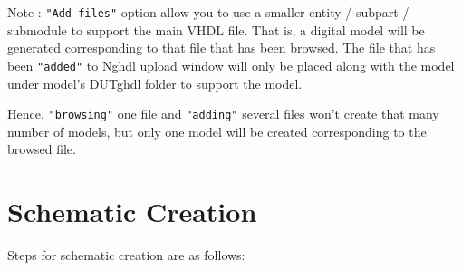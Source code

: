 \begin{enumerate}
Note : \texttt{"Add files"} option allow you to use a smaller entity / subpart / submodule to support the main VHDL file. That is, a digital model will be generated corresponding to that file that has been browsed. The file that has been \texttt{"added"} to Nghdl upload window will only be placed along with the model under model’s DUTghdl folder to support the model.

Hence, \texttt{"browsing"} one file and \texttt{"adding"} several files won’t create that many number of models, but only one model will be created corresponding to the browsed file.
\end{enumerate}

\section{Schematic Creation}
Steps for schematic creation are as follows:
